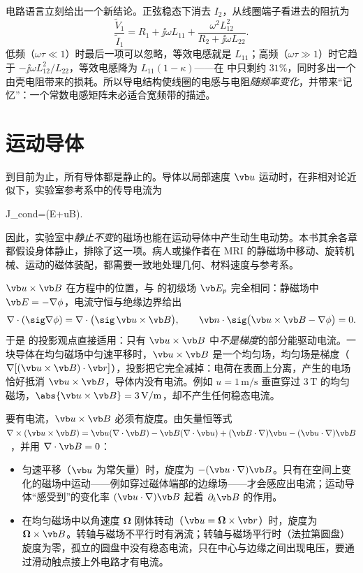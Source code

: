 电路语言立刻给出一个新结论。正弦稳态下消去 $I_2$，从线圈端子看进去的阻抗为
\begin{equation}
\frac{\widetilde V_1}{\widetilde I_1}=R_1+\jj\omega L_{11}+\frac{\omega^2L_{12}^2}{R_2+\jj\omega L_{22}} .
\end{equation}
低频（$\omega\tau\ll1$）时最后一项可以忽略，等效电感就是 $L_{11}$；高频（$\omega\tau\gg1$）时它趋于 $-\jj\omega L_{12}^2/L_{22}$，等效电感降为 $L_{11}(1-\kappa)$——在 中只剩约 $31\%$，同时多出一个由壳电阻带来的损耗。所以导电结构使线圈的电感与电阻\emph{随频率变化}，并带来“记忆”：一个常数电感矩阵未必适合宽频带的描述。

\section{运动导体}\label{sec:eddy-motion}

到目前为止，所有导体都是静止的。导体以局部速度 $\vb u$ 运动时，在非相对论近似下，实验室参考系中的传导电流为
\begin{keyeq*}
\vb J_{\rm cond}=\sig\bigl(\vb E+\vb u\times\vb B\bigr).
\end{keyeq*}
因此，实验室中\emph{静止不变}的磁场也能在运动导体中产生动生电动势。本书其余各章都假设身体静止，排除了这一项。病人或操作者在 MRI 的静磁场中移动、旋转机械、运动的磁体装配，都需要一致地处理几何、材料速度与参考系。

$\vb u\times\vb B$ 在方程中的位置，与 的初级场 $\vb E_p$ 完全相同：静磁场中 $\vb E=-\nabla\phi$，电流守恒与绝缘边界给出
\begin{equation}
\nabla\cdot(\sig\nabla\phi)=\nabla\cdot\bigl(\sig\,\vb u\times\vb B\bigr),\qquad \vb n\cdot\sig\bigl(\vb u\times\vb B-\nabla\phi\bigr)=0 .
\end{equation}
于是 的投影观点直接适用：只有 $\vb u\times\vb B$ 中\emph{不是梯度}的部分能驱动电流。一块导体在均匀磁场中匀速平移时，$\vb u\times\vb B$ 是一个均匀场，均匀场是梯度（$\nabla[(\vb u\times\vb B)\cdot\vb r]$），投影把它完全减掉：电荷在表面上分离，产生的电场恰好抵消 $\vb u\times\vb B$，导体内没有电流。例如 $u=1\,\mathrm{m/s}$ 垂直穿过 $3\,\mathrm T$ 的均匀磁场，$\abs{\vb u\times\vb B}=3\,\mathrm{V/m}$，却不产生任何稳态电流。

要有电流，$\vb u\times\vb B$ 必须有旋度。由矢量恒等式 $\nabla\times(\vb u\times\vb B)=\vb u(\nabla\cdot\vb B)-\vb B(\nabla\cdot\vb u)+(\vb B\cdot\nabla)\vb u-(\vb u\cdot\nabla)\vb B$~\cite{griffiths}，并用 $\nabla\cdot\vb B=0$：
\begin{itemize}
\item 匀速平移（$\vb u$ 为常矢量）时，旋度为 $-(\vb u\cdot\nabla)\vb B$。只有在空间上变化的磁场中运动——例如穿过磁体端部的边缘场——才会感应出电流；运动导体“感受到”的变化率 $(\vb u\cdot\nabla)\vb B$ 起着 $\partial_t\vb B$ 的作用。
\item 在均匀磁场中以角速度 $\boldsymbol\Omega$ 刚体转动（$\vb u=\boldsymbol\Omega\times\vb r$）时，旋度为 $\boldsymbol\Omega\times\vb B$。转轴与磁场不平行时有涡流；转轴与磁场平行时（法拉第圆盘）旋度为零，孤立的圆盘中没有稳态电流，只在中心与边缘之间出现电压，要通过滑动触点接上外电路才有电流。
\end{itemize}

